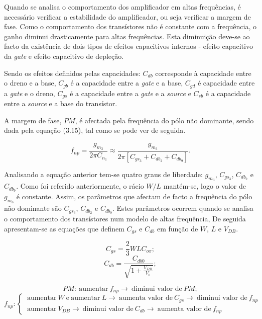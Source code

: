 \documentclass[11pt]{article}
\numberwithin{equation}{section}
\begin{document}
Quando se analisa o comportamento dos amplificador em altas frequências, é necessário verificar a estabilidade do amplificador, ou seja verificar a margem de fase. Como o comportamento dos transístores não é constante com a frequência, o ganho diminui drasticamente para altas frequências. Esta diminuição deve-se ao facto da existência de dois tipos de efeitos capacitivos internos - efeito capacitivo da \textit{gate} e efeito capacitivo de depleção.

Sendo os efeitos definidos pelas capacidades: $C_{db}$ corresponde à capacidade entre o dreno e a base, $C_{gb}$ é a capacidade entre a \textit{gate} e a base, $C_{gd}$ é capacidade entre a \textit{gate} e o dreno, $C_{gs}$ é a capacidade entre a \textit{gate} e a \textit{source} e $C_{sb}$ é a capacidade entre a \textit{source} e a base do transístor. 

A margem de fase, $PM$, é afectada pela frequência do pólo não dominante, sendo dada pela equação (3.15), tal como se pode ver de seguida.

\vspace{-3mm}
\begin{equation}
f_{np} = \frac{g_{m_3}}{2\pi C_{n_1}} \approx \frac{g_{m_3}}{2\pi \left[C_{gs_3} + C_{db_2} + C_{db_9}\right]}.
\end{equation}

\vspace{3mm}
Analisando a equação anterior tem-se quatro graus de liberdade: $g_{m_3}$, $C_{gs_3}$, $C_{db_2}$ e $C_{db_9}$. Como foi referido anteriormente, o rácio $W/L$ mantém-se, logo o valor de $g_{m_3}$ é constante. Assim, os parâmetros que afectam de facto a frequência do pólo não dominante são $C_{gs_3}$, $C_{db_2}$ e $C_{db_9}$. Estes parâmetros ocorrem quando se analisa o comportamento dos transístores num modelo de altas frequência,  De seguida apresentam-se as equações que definem $C_{gs}$ e $C_{db}$ em função de $W$, $L$ e $V_{DB}$.


\vspace{-3mm}
\begin{equation}
C_{gs} = \frac{2}{3} W L C_{ox};
\end{equation}
\vspace{-2mm}
\begin{equation}
C_{db} = \frac{C_{db0}}{\sqrt{1 + \frac{V_{DB}}{V_0}}};
\end{equation}
	
\vspace{1mm}

\begin{equation}
	PM: ~\text{aumentar}~f_{np}\rightarrow~\text{diminui valor de}~PM;
\end{equation}
\begin{equation}
f_{np}:  \begin{cases} ~\text{aumentar}~W~\text{e}~\text{aumentar}~L \rightarrow~\text{aumenta valor de}~C_{gs} \rightarrow~\text{diminui valor de}~f_{np} \\ ~\text{aumentar}~V_{DB} \rightarrow~\text{diminui valor de}~C_{db} \rightarrow~\text{aumenta valor de}~f_{np}\end{cases}
\end{equation}
\end{document}
